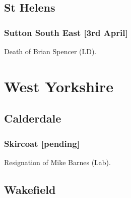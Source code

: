 \documentclass[a4paper,openany]{book}
\begin{document}
\begin{resultsiii}
\subsection*{St Helens}

\subsubsection*{Sutton South East \hspace*{\fill}\nolinebreak[1]%
	\enspace\hspace*{\fill}
	[3rd April]}


Death of Brian Spencer (LD).

%
%

\section{West Yorkshire}

\subsection*{Calderdale}

\subsubsection*{Skircoat \hspace*{\fill}\nolinebreak[1]%
	\enspace\hspace*{\fill}
	[pending]}


Resignation of Mike Barnes (Lab).

\subsection*{Wakefield}


\end{resultsiii}
\end{document}
